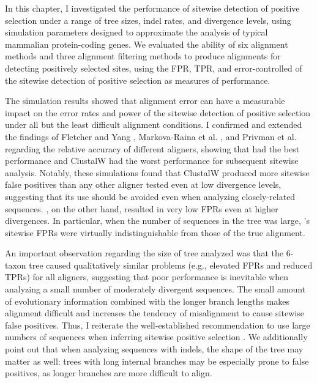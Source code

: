 In this chapter, I investigated the performance of sitewise detection
of positive selection under a range of tree sizes, indel rates, and
divergence levels, using simulation parameters designed to approximate
the analysis of typical mammalian protein-coding genes. We
evaluated the ability of six alignment methods and three alignment
filtering methods to produce alignments for detecting positively
selected sites, using the FPR, TPR, and error-controlled \tpr of the
sitewise detection of positive selection as measures of
performance.

The simulation results showed that alignment error can have a
measurable impact on the error rates and power of the sitewise
detection of positive selection under all but the least difficult
alignment conditions. I confirmed and extended the findings of
Fletcher and Yang \citeyearpar{Fletcher2010}, Markova-Raina et
al. \citeyearpar{Markova-Raina2011High}, and Privman et
al. \citeyearpar{Privman2011Improving} regarding the relative accuracy
of different aligners, showing that \prankc had the best performance
and ClustalW had the worst performance for subsequent sitewise
analysis. Notably, these simulations found that ClustalW produced more
sitewise false positives than any other aligner tested even at low
divergence levels, suggesting that its use should be avoided even when
analyzing closely-related sequences. \prankc, on the other hand,
resulted in very low FPRs even at higher divergences. In particular, when the
number of sequences in the tree was large, \prankc{}'s sitewise FPRs
were virtually indistinguishable from those of the true alignment.

An important observation regarding the size of tree analyzed was that
the 6-taxon tree caused qualitatively similar problems (e.g., elevated
FPRs and reduced TPRs) for all aligners, suggesting that poor
performance is inevitable when analyzing a small number of moderately
divergent sequences. The small amount of evolutionary information
combined with the longer branch lengths makes alignment difficult and
increases the tendency of misalignment to cause sitewise false
positives. Thus, I reiterate the well-established recommendation to
use large numbers of sequences when inferring sitewise positive
selection \citep{Anisimova2001,Anisimova2002}. We
additionally point out that when analyzing sequences with indels, the
shape of the tree may matter as well: trees with long internal
branches may be especially prone to false positives, as longer
branches are more difficult to align.

